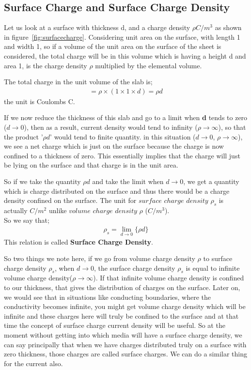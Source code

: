 \subsection{Surface Charge and Surface Charge Density}
Let us look at a surface with thickness d, and a charge density $\rho$$C/m^{3}$ as shown in figure~\ref{fig:surfacecharge}. Considering unit area on the surface, with length 1 and width 1, so if a volume of the unit area on the surface of the sheet is considered, the total charge will be in this volume which is having a height d and area 1, is the charge density $\rho$ multiplied by the elemental volume.

The total charge in the unit volume of the slab is;
\begin{align*}
=\rho\times(1\times 1\times d)=\rho d
\end{align*}
the unit is Coulombs C.

If we now reduce the thickness of this slab and go to a limit when \textbf{d} tends to zero ($d\rightarrow 0$), then as a result, current density would tend to infinity ($\rho\rightarrow\infty$), so that the product '$\rho d$' would tend to finite quantity. in this situation ($d\rightarrow 0$, $\rho\rightarrow\infty$), we see a net charge which is just on the surface because the charge is now confined to a thickness of zero. This essentially implies that the charge will just be lying on the surface and that charge is in the unit area. 


So if we take the quantity $\rho d$ and take the limit when $d\rightarrow0$, we get a quantity which is charge distributed on the surface and thus there would be a charge density confined on the surface. The unit for $surface$ $charge$ $density$ $\rho_{s}$ is actually $C/m^{2}$ unlike $volume$ $charge$ $density$ $\rho$ ($C/m^{3}$).\\
So we say that;
\begin{align}
\rho_{s}=\lim_{d\rightarrow0}\{\rho d\} 
\end{align}
This relation is called \textbf{Surface Charge Density}.

So two things we note here, if we go from volume charge density $\rho$ to surface charge density $\rho_{s}$, when $d\rightarrow0$, the surface charge density $\rho_{s}$ is equal to infinite volume charge density($\rho\rightarrow\infty$). If that infinite volume charge density is confined to our thickness, that gives the distribution of charges on the surface. Later on, we would see that in situations like conducting boundaries, where the conductivity becomes infinite, you might get volume charge density which will be infinite and these charges here will truly be confined to the surface and at that time the concept of surface charge current density will be useful. So at the moment without getting into which media will have a surface charge density, we can say principally that when we have charges distributed truly on a surface with zero thickness, those charges are called surface charges. We can do a similar thing for the current also.

